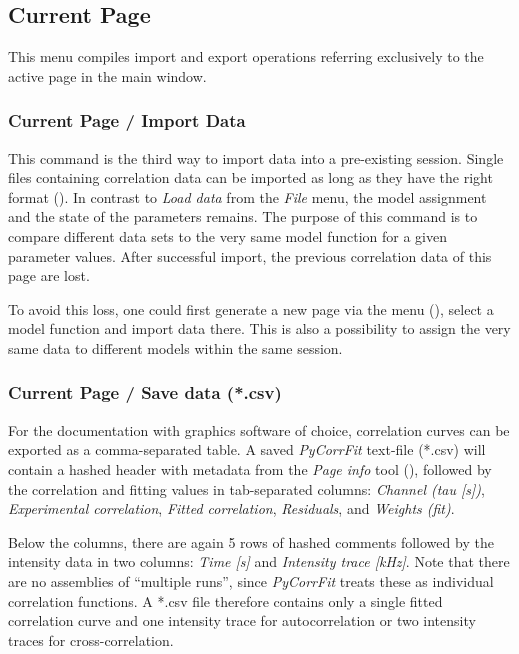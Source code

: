 \subsection{Current Page}
\label{sec:menub.curre}
This menu compiles import and export operations referring exclusively to the active page in the main window. 

\subsubsection{Current Page / Import Data}
\label{sec:menub.curre.impor}
This command is the third way to import data into a pre-existing session. Single files containing correlation data can be imported as long as they have the right format (). In contrast to \textit{Load data} from the \textit{File} menu, the model assignment and the state of the parameters remains. The purpose of this command is to compare different data sets to the very same model function for a given parameter values. After successful import, the previous correlation data of this page are lost.

To avoid this loss, one could first generate a new page via the menu (), select a model function and import data there. This is also a possibility to assign the very same data to different models within the same session.

\subsubsection{Current Page / Save data (*.csv)}
\label{sec:menub.curre.saved}
For the documentation with graphics software of choice, correlation curves can be exported as a comma-separated table. A saved \textit{PyCorrFit} text-file (*.csv) will contain a hashed header with metadata from the \textit{Page info} tool (), followed by the correlation and fitting values in tab-separated columns: \textit{Channel (tau [s])}, \textit{Experimental correlation}, \textit{Fitted correlation}, \textit{Residuals}, and \textit{Weights (fit)}. 

Below the columns, there are again 5 rows of hashed comments followed by the intensity data in two columns: \textit{Time [s]} and \textit{Intensity trace [kHz]}. Note that there are no assemblies of ``multiple runs'', since \textit{PyCorrFit} treats these as individual correlation functions. A *.csv file therefore contains only a single fitted correlation curve and one intensity trace for autocorrelation or two intensity traces for cross-correlation.

